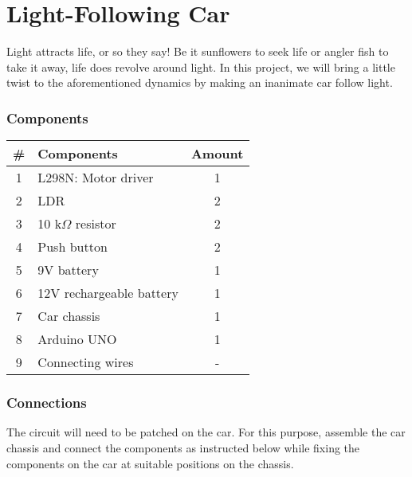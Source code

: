 \chapter{Light-Following Car}


Light attracts life, or so they say! Be it sunflowers to seek life or angler fish to take it away, life does revolve around light. In this project, we will bring a little twist to the aforementioned dynamics by making an inanimate car follow light.

\subsection*{Components}
\begin{table}[H]
    \centering
    \begin{tabular}{|c|l|c|}\hline
     \textbf{\#} & \textbf{Components} &  \textbf{Amount}\\\hline
     1 & L298N: Motor driver       &  1\\\hline
     2 & LDR                        & 2\\\hline
     3 & 10 k$\Omega$ resistor      & 2 \\\hline
     4 & Push button                &  2\\\hline
     5 & 9V battery                 &  1\\\hline
     6 & 12V rechargeable battery   &  1\\\hline
     7 & Car chassis                & 1 \\\hline
     8 & Arduino UNO                & 1 \\\hline
     9 & Connecting wires           & - \\\hline
     
    \end{tabular}
\end{table}


\subsection*{Connections}

The circuit will need to be patched on the car. For this purpose, assemble the car chassis and connect the components as instructed below while fixing the components on the car at suitable positions on the chassis.

